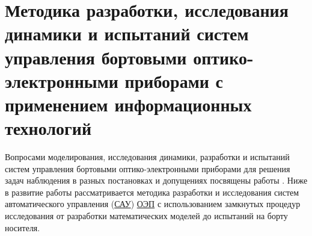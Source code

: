 \chapter{Методика разработки, исследования динамики и испытаний систем управления бортовыми оптико-электронными приборами с применением информационных технологий} \label{ch:ch2}

\begin{comment}
В настоящее время наиболее распространены в народном хозяйстве и военной технике комплексированные оптико - электронные системы (КОЭП) визуализации, включающие в себя каналы наблюдения и зондирования в широком спектре волн оптического диапазона \cite[]{Tarasov},\cite[]{Belyakov},\cite[]{Karpov},\cite[]{Torshina}. Появление на рынке матричных фотоприемников расширило возможности КОЭП и К(комплексов). Несмотря на интенсивное развитие теории и методов расчета и совершенствование бортовых автоматических КОЭП и К возникают ряд вопросов, влияющих на качество получаемой оптической информации, в частности – это вопросы динамики и качества управления и увязки их с оптическими характеристиками каналов визуализации \cite[]{Belyakov},\cite[]{Karpov}, \cite[]{Baloev16}, \cite[]{Karpov17}.
\end{comment}

Вопросами моделирования, исследования динамики, разработки и испытаний систем управления бортовыми оптико-электронными приборами для решения задач наблюдения в разных постановках и допущениях посвящены работы \cite{Tarasov,Belyakov,Torshina,Ivanov18,Bessekerski20,Karpov,BLDC_Stefan,Baloev16,Karpov17,Gerasin19,Molin21,Sokolski22,Karpov23,Babaev38-a2-13,Bessekerski-a2-14,Malivanov-a2-9,Babatko-a2-17}. 
Ниже в развитие работы \cite[]{Tarasov} рассматривается методика разработки и исследования систем автоматического управления (\hyperref[acroSAU]{САУ}) \hyperref[acroEOS]{ОЭП} с использованием замкнутых процедур исследования от разработки математических моделей до испытаний на борту носителя.



